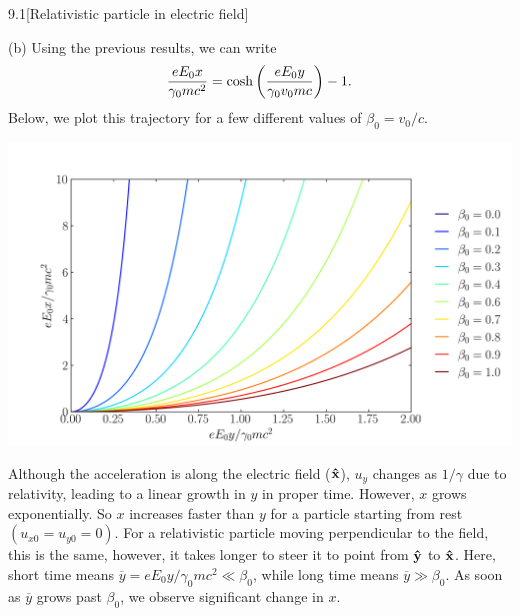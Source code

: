 \documentclass[12pt]{article}
\begin{document}
\begin{problem}{9.1}[Relativistic particle in electric field]
\begin{solution}
(b) Using the previous results, we can write
\begin{equation}
    \frac{eE_0x}{\gamma_0mc^2}=\cosh\qty(\frac{eE_0y}{\gamma_0v_0mc})-1. 
\end{equation}
Below, we plot this trajectory for a few different values of $\beta_0=v_0/c$.
\begin{center}
    \includegraphics[width=\textwidth]{p1.png} 
\end{center}
Although the acceleration is along the electric field ($\vb{\hat{x}}$), $u_y$
changes as $1/\gamma$ due to relativity, leading to a linear growth in $y$ in
proper time. However, $x$ grows exponentially. So $x$ increases faster than $y$
for a particle starting from rest $(u_{x0}=u_{y0}=0)$. For a relativistic
particle moving perpendicular to the field, this is the same, however, it takes
longer to steer it to point from $\vb{\hat{y}}$ to $\vb{\hat{x}}$. Here, short time means
$\overline{y}=eE_0y/\gamma_0mc^2\ll\beta_0$, while long time means 
$\overline{y}\gg\beta_0$. As soon as $\overline{y}$ grows past $\beta_0$, 
we observe significant change in $x$.
\end{solution}
\end{problem}
\newpage
\end{document}
